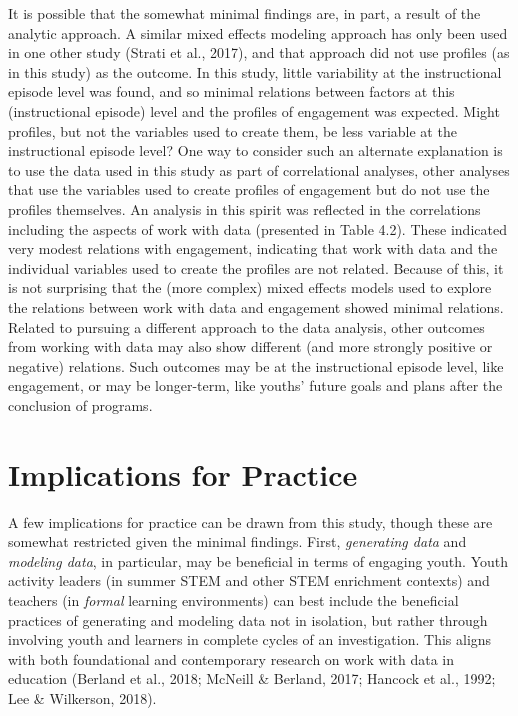 \documentclass[]{book}
\theoremstyle{definition}
\theoremstyle{definition}
\theoremstyle{definition}
\theoremstyle{remark}
\begin{document}
It is possible that the somewhat minimal findings are, in part, a result
of the analytic approach. A similar mixed effects modeling approach has
only been used in one other study (Strati et al., 2017), and that
approach did not use profiles (as in this study) as the outcome. In this
study, little variability at the instructional episode level was found,
and so minimal relations between factors at this (instructional episode)
level and the profiles of engagement was expected. Might profiles, but
not the variables used to create them, be less variable at the
instructional episode level? One way to consider such an alternate
explanation is to use the data used in this study as part of
correlational analyses, other analyses that use the variables used to
create profiles of engagement but do not use the profiles themselves. An
analysis in this spirit was reflected in the correlations including the
aspects of work with data (presented in Table 4.2). These indicated very
modest relations with engagement, indicating that work with data and the
individual variables used to create the profiles are not related.
Because of this, it is not surprising that the (more complex) mixed
effects models used to explore the relations between work with data and
engagement showed minimal relations. Related to pursuing a different
approach to the data analysis, other outcomes from working with data may
also show different (and more strongly positive or negative) relations.
Such outcomes may be at the instructional episode level, like
engagement, or may be longer-term, like youths' future goals and plans
after the conclusion of programs.

\section{Implications for Practice}\label{implications-for-practice}

A few implications for practice can be drawn from this study, though
these are somewhat restricted given the minimal findings. First,
\emph{generating data} and \emph{modeling data}, in particular, may be
beneficial in terms of engaging youth. Youth activity leaders (in summer
STEM and other STEM enrichment contexts) and teachers (in \emph{formal}
learning environments) can best include the beneficial practices of
generating and modeling data not in isolation, but rather through
involving youth and learners in complete cycles of an investigation.
This aligns with both foundational and contemporary research on work
with data in education (Berland et al., 2018; McNeill \& Berland, 2017;
Hancock et al., 1992; Lee \& Wilkerson, 2018).
\end{document}
